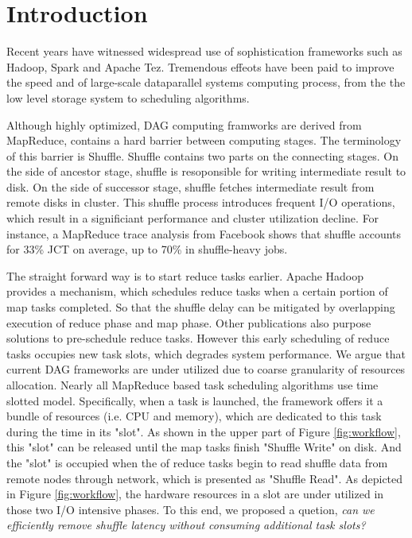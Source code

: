 \section{Introduction}

Recent years have witnessed widespread use of sophistication frameworks such as Hadoop\cite{hadoop}, Spark\cite{spark} and Apache Tez\cite{tez}.
Tremendous effeots have been paid to improve the speed and of large-scale dataparallel systems computing process, from the the low level storage system to scheduling algorithms.

Although highly optimized, DAG computing framworks are derived from MapReduce\cite{mapreduce}, contains a hard barrier between computing stages. The terminology of this barrier is Shuffle. Shuffle contains two parts on the connecting stages. On the side of ancestor stage, shuffle is resoponsible for writing intermediate result to disk. On the side of successor stage, shuffle fetches intermediate result from remote disks in cluster. This shuffle process introduces frequent I/O operations, which result in a significiant performance and cluster utilization decline. For instance, a MapReduce trace analysis from Facebook shows that shuffle accounts for 33\% JCT on average, up to 70\% in shuffle-heavy jobs\cite{manage}.

The straight forward way is to start reduce tasks earlier. Apache Hadoop\cite{hadoop} provides a mechanism, which schedules reduce tasks when a certain portion of map tasks completed. So that the shuffle delay can be mitigated by overlapping execution of reduce phase and map phase. Other publications also purpose solutions to pre-schedule reduce tasks\cite{ihadoop, ishuffle, dynmr}. However this early scheduling of reduce tasks occupies new task slots, which degrades system performance. We argue that current DAG frameworks are under utilized due to coarse granularity of resources allocation. Nearly all
MapReduce based task scheduling algorithms use time slotted model. Specifically, when a task is launched, the framework offers it a bundle of resources (i.e. CPU and memory), which are dedicated to this task during the time in its "slot". As shown in the upper part of Figure \ref{fig:workflow}, this "slot" can be released until the map tasks finish "Shuffle Write" on disk. And the "slot" is occupied when the of reduce tasks begin to read shuffle data from remote nodes through network, which is presented as "Shuffle Read". As depicted in Figure \ref{fig:workflow}, the hardware resources in a slot are under utilized in those two I/O intensive phases. To this end, we proposed a quetion, \textit{can we efficiently remove shuffle latency without consuming additional task slots?} 

